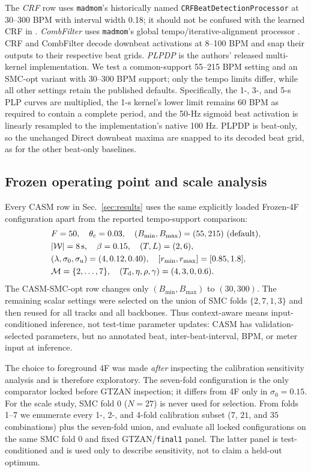\documentclass{article}
\begin{document}
The \emph{CRF} row uses \texttt{madmom}'s historically named
\texttt{CRFBeatDetectionProcessor} \cite{korzeniowski2014crf} at 30--300 BPM
with interval width 0.18; it should not be confused with the learned CRF in
\cite{fillon2015crf}. \emph{CombFilter} uses \texttt{madmom}'s global
tempo/iterative-alignment processor \cite{bock2015combfilter}. CRF and
CombFilter decode downbeat activations at 8--100 BPM and snap their outputs to
their respective beat grids. \emph{PLPDP} \cite{chiu2023localperiodicity} is
the authors' released multi-kernel implementation. We test a common-support
55--215 BPM setting and an SMC-opt variant with 30--300 BPM support; only the
tempo limits differ, while all other settings retain the published defaults.
Specifically, the 1-, 3-, and 5-s PLP curves are multiplied, the 1-s kernel's
lower limit remains 60 BPM as required to contain a complete period, and the
50-Hz sigmoid beat activation is linearly resampled to the implementation's
native 100 Hz. PLPDP is beat-only, so the unchanged Direct downbeat maxima are
snapped to its decoded beat grid, as for the other beat-only baselines.

\subsection{Frozen operating point and scale analysis}

Every CASM row in Sec.~\ref{sec:results} uses the same explicitly loaded
Frozen-4F configuration apart from the reported tempo-support comparison:
\[
\begin{split}
&F=50,\quad \theta_{\mathrm c}=0.03,\quad
(B_{\min},B_{\max})=(55,215)\ \text{(default)},\\
&|\mathcal W|=8{\rm\,s},\quad \beta=0.15,\quad
(T,L)=(2,6),\\
&(\lambda,\sigma_0,\sigma_{\mathrm u})=(4,0.12,0.40),\quad
[r_{\min},r_{\max}]=[0.85,1.8],\\
&\mathcal M=\{2,\ldots,7\},\quad
(T_{\mathrm d},\eta,\rho,\gamma)=(4,3,0,0.6).
\end{split}
\]
The CASM-SMC-opt row changes only $(B_{\min},B_{\max})$ to $(30,300)$.
The remaining scalar settings were selected on the union of SMC folds
$\{2,7,1,3\}$ and then reused for all tracks and all backbones. Thus
context-aware means input-conditioned inference, not test-time parameter
updates: CASM has validation-selected parameters, but no annotated beat,
inter-beat-interval, BPM, or meter input at inference.

The choice to foreground 4F was made \emph{after} inspecting the calibration
sensitivity analysis and is therefore exploratory. The seven-fold
configuration is the only comparator locked before GTZAN inspection; it
differs from 4F only in $\sigma_0=0.15$. For the scale study, SMC fold 0
($N=27$) is never used for selection. From folds 1--7 we enumerate every
1-, 2-, and 4-fold calibration subset ($7$, $21$, and $35$ combinations) plus
the seven-fold union, and evaluate all locked configurations on the same SMC
fold 0 and fixed GTZAN/\texttt{final1} panel. The latter panel is
test-conditioned and is used only to describe sensitivity, not to claim a
held-out optimum.
\end{document}
